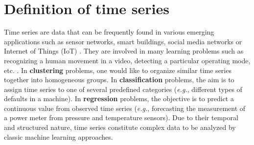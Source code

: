 

\section{Definition of time series}
Time series are data that 
can be frequently found in various emerging applications such as sensor networks, smart buildings, social media networks or Internet of Things (IoT) \cite{Najmeddine2012,Nguyen2012,Yin2008}. They are involved in many learning problems such as recognizing a human movement in a video, detecting a particular operating mode, etc.  \cite{PANAGIOTAKIS2008,Ramasso2008}. In \textbf{clustering} problems, one would like to organize similar time series together into homogeneous groups. In \textbf{classification} problems, the aim is to assign time series to one of several predefined categories (\textit{e.g.}, different types of defaults in a machine). In \textbf{regression} problems, the objective is to predict a continuous value from observed time series (\textit{e.g.}, forecasting the measurement of a power meter from pressure and temperature sensors). Due to their temporal and structured nature, time series constitute complex data to be analyzed by classic machine learning approaches.

